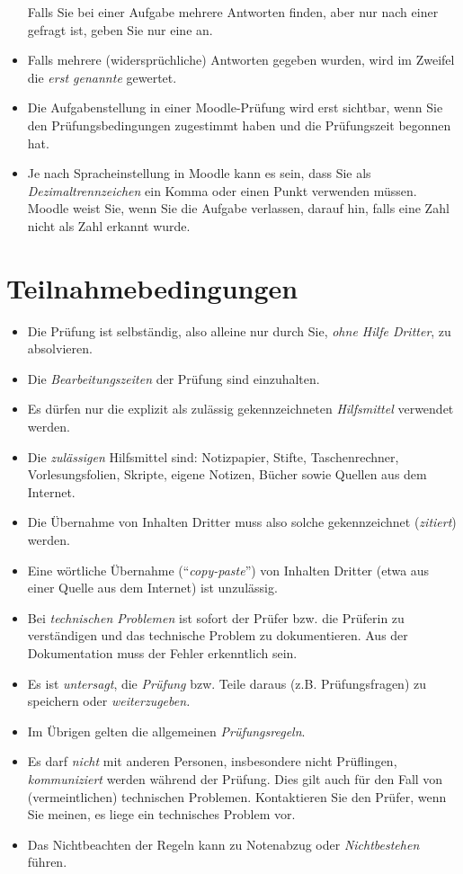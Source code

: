 \documentclass[
  a4paper,
  DIV=11]{scrreprt}
\providecommand{\tightlist}{%
  \setlength{\itemsep}{0pt}\setlength{\parskip}{0pt}}\usepackage{longtable,booktabs,array}
\theoremstyle{definition}
\theoremstyle{remark}
\begin{document}
\begin{itemize}
  Falls Sie bei einer Aufgabe mehrere Antworten finden, aber nur nach
  einer gefragt ist, geben Sie nur eine an.
\item
  Falls mehrere (widersprüchliche) Antworten gegeben wurden, wird im
  Zweifel die \emph{erst genannte} gewertet.
\item
  Die Aufgabenstellung in einer Moodle-Prüfung wird erst sichtbar, wenn
  Sie den Prüfungsbedingungen zugestimmt haben und die Prüfungszeit
  begonnen hat.
\item
  Je nach Spracheinstellung in Moodle kann es sein, dass Sie als
  \emph{Dezimaltrennzeichen} ein Komma oder einen Punkt verwenden
  müssen. Moodle weist Sie, wenn Sie die Aufgabe verlassen, darauf hin,
  falls eine Zahl nicht als Zahl erkannt wurde.
\end{itemize}

\hypertarget{teilnahmebedingungen}{%
\section{Teilnahmebedingungen}\label{teilnahmebedingungen}}

\begin{itemize}
\tightlist
\item
  Die Prüfung ist selbständig, also alleine nur durch Sie, \emph{ohne
  Hilfe Dritter}, zu absolvieren.
\item
  Die \emph{Bearbeitungszeiten} der Prüfung sind einzuhalten.
\item
  Es dürfen nur die explizit als zulässig gekennzeichneten
  \emph{Hilfsmittel} verwendet werden.
\item
  Die \emph{zulässigen} Hilfsmittel sind: Notizpapier, Stifte,
  Taschenrechner, Vorlesungsfolien, Skripte, eigene Notizen, Bücher
  sowie Quellen aus dem Internet.
\item
  Die Übernahme von Inhalten Dritter muss also solche gekennzeichnet
  (\emph{zitiert}) werden.
\item
  Eine wörtliche Übernahme (``\emph{copy-paste}'') von Inhalten Dritter
  (etwa aus einer Quelle aus dem Internet) ist unzulässig.
\item
  Bei \emph{technischen Problemen} ist sofort der Prüfer bzw. die
  Prüferin zu verständigen und das technische Problem zu dokumentieren.
  Aus der Dokumentation muss der Fehler erkenntlich sein.
\item
  Es ist \emph{untersagt}, die \emph{Prüfung} bzw. Teile daraus (z.B.
  Prüfungsfragen) zu speichern oder \emph{weiterzugeben.}
\item
  Im Übrigen gelten die allgemeinen \emph{Prüfungsregeln}.
\item
  Es darf \emph{nicht} mit anderen Personen, insbesondere nicht
  Prüflingen, \emph{kommuniziert} werden während der Prüfung. Dies gilt
  auch für den Fall von (vermeintlichen) technischen Problemen.
  Kontaktieren Sie den Prüfer, wenn Sie meinen, es liege ein technisches
  Problem vor.
\item
  Das Nichtbeachten der Regeln kann zu Notenabzug oder
  \emph{Nichtbestehen} führen.
\end{itemize}
\end{document}
